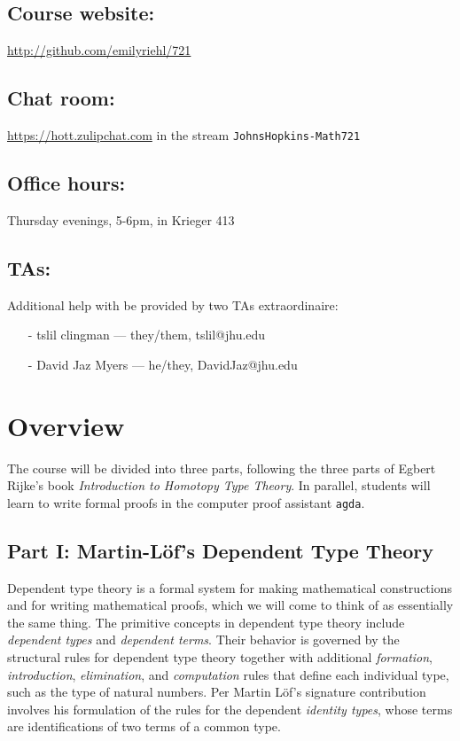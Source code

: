 \documentclass{amsart}
\theoremstyle{definition}
\theoremstyle{remark}
\numberwithin{equation}{section}
\begin{document}
 \subsection*{Course website:} \url{http://github.com/emilyriehl/721}
\subsection*{Chat room:} \url{https://hott.zulipchat.com} in the stream \texttt{JohnsHopkins-Math721}

 \subsection*{Office hours:} Thursday evenings, 5-6pm, in Krieger 413

\subsection*{TAs:} Additional help with be provided by two TAs extraordinaire:
\begin{itemize}
\item[-] tslil clingman --- they/them, tslil@jhu.edu 
\item[-] David Jaz Myers --- he/they, DavidJaz@jhu.edu 
\end{itemize}



\section*{Overview} 

The course will be divided into three parts, following the three parts of Egbert Rijke's book \emph{Introduction to Homotopy Type Theory}. In parallel, students will learn to write formal proofs in the computer proof assistant \texttt{agda}.

\subsection*{Part I: Martin-L\"{o}f's Dependent Type Theory} Dependent type theory is a formal system for making mathematical constructions and for writing mathematical proofs, which we will come to think of as essentially the same thing. The primitive concepts in dependent type theory include \emph{dependent types} and \emph{dependent terms}. Their behavior is governed by the structural rules for dependent type theory together with additional \emph{formation}, \emph{introduction}, \emph{elimination}, and \emph{computation} rules that define each individual type, such as the type of natural numbers. Per Martin L\"{o}f's signature contribution involves his formulation of the rules for the dependent \emph{identity types}, whose terms are identifications of two terms of a common type. 
\end{document}
